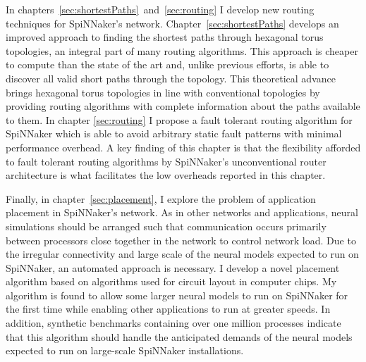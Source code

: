 In chapters~\ref{sec:shortestPaths}~and~\ref{sec:routing} I develop new routing
techniques for SpiNNaker's network. Chapter~\ref{sec:shortestPaths} develops an
improved approach to finding the shortest paths through hexagonal torus
topologies, an integral part of many routing algorithms. This approach is
cheaper to compute than the state of the art and, unlike previous efforts, is
able to discover all valid short paths through the topology. This theoretical
advance brings hexagonal torus topologies in line with conventional topologies
by providing routing algorithms with complete information about the paths
available to them. In chapter \ref{sec:routing} I propose a fault tolerant
routing algorithm for SpiNNaker which is able to avoid arbitrary static fault
patterns with minimal performance overhead. A key finding of this chapter is
that the flexibility afforded to fault tolerant routing algorithms by
SpiNNaker's unconventional router architecture is what facilitates the low
overheads reported in this chapter.

Finally, in chapter~\ref{sec:placement}, I explore the problem of application
placement in SpiNNaker's network. As in other networks and applications, neural
simulations should be arranged such that communication occurs primarily between
processors close together in the network to control network load. Due to the
irregular connectivity and large scale of the neural models expected to run on
SpiNNaker, an automated approach is necessary. I develop a novel placement
algorithm based on algorithms used for circuit layout in computer chips. My
algorithm is found to allow some larger neural models to run on SpiNNaker for
the first time while enabling other applications to run at greater speeds. In
addition, synthetic benchmarks containing over one million processes indicate
that this algorithm should handle the anticipated demands of the neural models
expected to run on large-scale SpiNNaker installations.
